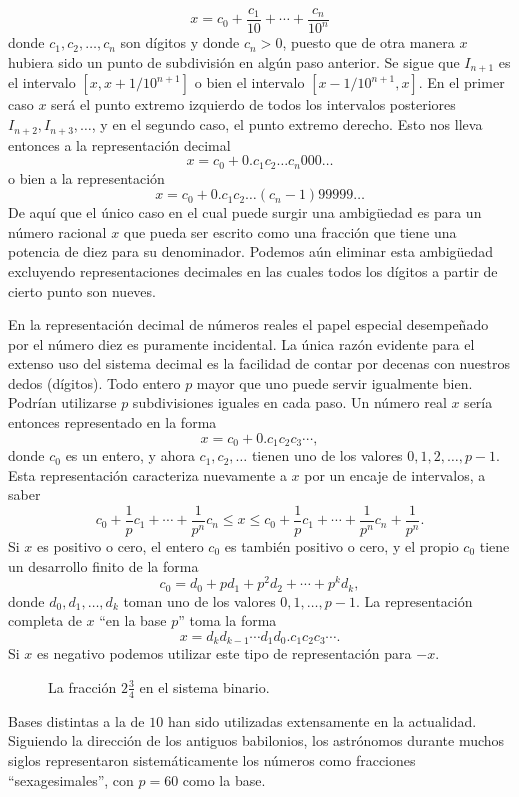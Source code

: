\documentclass[12pt]{book}
\theoremstyle{definition}
\begin{document}
\[
x = c_0 + \frac{c_1}{10} + \cdots + \frac{c_n}{10^n}
\]
donde $c_1, c_2, \dots, c_n$ son dígitos y donde $c_n > 0$, puesto que de otra manera $x$ hubiera sido un punto de subdivisión en algún paso anterior. Se sigue que $I_{n+1}$ es el intervalo $[x, x + 1/10^{n+1}]$ o bien el intervalo $[x - 1/10^{n+1}, x]$. En el primer caso $x$ será el punto extremo izquierdo de todos los intervalos posteriores $I_{n+2}, I_{n+3}, \dots$, y en el segundo caso, el punto extremo derecho. Esto nos lleva entonces a la representación decimal
\[
x = c_0 + 0.c_1c_2\ldots c_n000\ldots
\]
o bien a la representación
\[
x = c_0 + 0.c_1c_2\ldots (c_n-1)99999\ldots
\]
De aquí que el único caso en el cual puede surgir una ambigüedad es para un número racional $x$ que pueda ser escrito como una fracción que tiene una potencia de diez para su denominador. Podemos aún eliminar esta ambigüedad excluyendo representaciones decimales en las cuales todos los dígitos a partir de cierto punto son nueves.

En la representación decimal de números reales el papel especial desempeñado por el número diez es puramente incidental. La única razón evidente para el extenso uso del sistema decimal es la facilidad de contar por decenas con nuestros dedos (dígitos). Todo entero $p$ mayor que uno puede servir igualmente bien. Podrían utilizarse $p$ subdivisiones iguales en cada paso. Un número real $x$ sería entonces representado en la forma
\[
x = c_0 + 0.c_1c_2c_3\cdots,
\]
donde $c_0$ es un entero, y ahora $c_1, c_2, \dots$ tienen uno de los valores $0, 1, 2, \dots, p-1$. Esta representación caracteriza nuevamente a $x$ por un encaje de intervalos, a saber
\[
c_0 + \frac{1}{p}c_1 + \cdots + \frac{1}{p^n}c_n \le x \le c_0 + \frac{1}{p}c_1 + \cdots + \frac{1}{p^n}c_n + \frac{1}{p^n}.
\]
Si $x$ es positivo o cero, el entero $c_0$ es también positivo o cero, y el propio $c_0$ tiene un desarrollo finito de la forma
\[
c_0 = d_0 + pd_1 + p^2d_2 + \cdots + p^kd_k,
\]
donde $d_0, d_1, \dots, d_k$ toman uno de los valores $0, 1, \dots, p-1$. La representación completa de $x$ ``en la base $p$'' toma la forma
\[
x = d_k d_{k-1} \cdots d_1 d_0 . c_1 c_2 c_3 \cdots.
\]
Si $x$ es negativo podemos utilizar este tipo de representación para $-x$.

\begin{figure}[h]
\centering
\caption{La fracción $2\frac{3}{4}$ en el sistema binario.}
\end{figure}

Bases distintas a la de $10$ han sido utilizadas extensamente en la actualidad. Siguiendo la dirección de los antiguos babilonios, los astrónomos durante muchos siglos representaron sistemáticamente los números como fracciones ``sexagesimales'', con $p = 60$ como la base.
\end{document}
